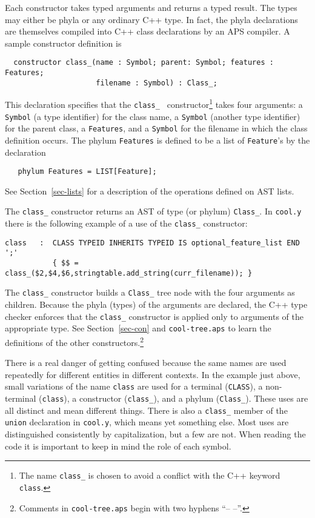 \documentclass[11pt]{article}
\begin{document}
Each constructor takes typed arguments and returns a typed result.  The types
may either be phyla or any ordinary C++ type.  In fact, the phyla declarations
are themselves compiled into C++ class declarations by an APS compiler.
A sample constructor definition is
\begin{verbatim}
  constructor class_(name : Symbol; parent: Symbol; features : Features;
                     filename : Symbol) : Class_;
\end{verbatim}
This declaration specifies that the {\tt class\_\ } constructor\footnote{The name
 {\tt class\_} is chosen to avoid a conflict with the C++ keyword {\tt class}.} takes four
arguments: a {\tt Symbol} (a type identifier) for the class name, a
{\tt Symbol} (another type identifier) for the parent class, a
{\tt Features}, and a {\tt Symbol} for the filename in which the class definition
occurs.  The phylum {\tt Features} is defined to be a list of {\tt Feature}'s
by the declaration
\begin{verbatim}
   phylum Features = LIST[Feature];
\end{verbatim}
See Section~\ref{sec-lists} for a description of the operations defined on
AST lists.

The {\tt class\_} constructor returns an AST of type
(or phylum) {\tt Class\_}.  In {\tt cool.y} there is the following example of a
use of the {\tt class\_} constructor:
\begin{verbatim}
class   :  CLASS TYPEID INHERITS TYPEID IS optional_feature_list END ';'
           { $$ = class_($2,$4,$6,stringtable.add_string(curr_filename)); }
\end{verbatim}
The {\tt class\_} constructor builds a {\tt Class\_}  tree node with the
four arguments as children.  Because the phyla (types) of the arguments
are declared, the C++ type checker enforces that the {\tt class\_} constructor is 
applied only to arguments of the appropriate type.
See Section~\ref{sec-con} and {\tt cool-tree.aps}  to learn the definitions of the other constructors.\footnote{Comments in {\tt cool-tree.aps} begin with two hyphens ``-- --''.}

There is a real danger of getting confused because the same names are
used repeatedly for different entities in different contexts.  In the
example just above, small variations of the name {\tt class} are used
for a terminal ({\tt CLASS}), a non-terminal ({\tt class}), a constructor
({\tt class\_}), and a phylum ({\tt Class\_}).  These
uses are all distinct and mean different things.  There is
also a {\tt class\_} member of the {\tt union} declaration in
{\tt cool.y}, which means yet something else.  Most uses are
distinguished consistently by capitalization, but a few are not.
When reading the code it is important to keep in mind the role of each
symbol.
\end{document}

